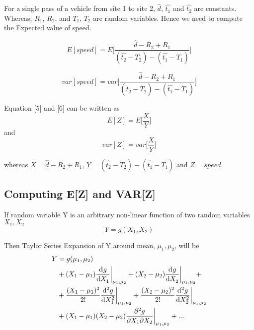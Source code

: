 \documentclass[10pt,twocolumn,letterpaper]{article}
\begin{document}
For a single pass of a vehicle from site 1 to site 2, $\hat{d}$, $\hat{t_1}$ and $\hat{t_2}$ are constants. Whereas, $R_1$, $R_2$, and $T_1$, $T_2$ are random variables. Hence we need to compute the Expected value of speed.

\begin{equation}
   E[speed] = E\bigg[ \frac{ \hat{d} - R_2 + R_1 }{ (\hat{t_2} - T_2 ) - (\hat{t_1} - T_1 ) } \bigg]
\end{equation}

\begin{equation}
   var[speed] = var\bigg[ \frac{ \hat{d} - R_2 + R_1 }{ (\hat{t_2} - T_2 ) - (\hat{t_1} - T_1 ) } \bigg] 
\end{equation}

Equation [5] and [6] can be written as 
\begin{equation}
   E[Z] = E\bigg[\frac{X}{Y}\bigg]
\end{equation}
and
\begin{equation} 
   var[Z] = var\bigg[\frac{X}{Y}\bigg]
\end{equation}

whereas \( X = \hat{d} - R_2 + R_1 \), \( Y = (\hat{t_2} - T_2 ) - (\hat{t_1} - T_1 ) \) and \( Z = speed\).

\subsection{Computing E[Z] and VAR[Z]}

If random variable Y is an arbitrary non-linear function of two random variables $X_1, X_2$ 
\begin{equation}
   Y = g(X_1, X_2)
\end{equation}

Then Taylor Series Expansion of Y around mean, $\mu_1, \mu_2$, will be
\begin{equation}
\label{Taylor_Expansion_of_G}
\begin{split}
   Y &= g(\mu_1, \mu_2) \\ &+ (X_1-\mu_1)\dv[]{g}{X_1}\bigg|_{\mu_1,\mu_2}+ (X_2-\mu_2)\dv[ ]{g}{X_2}\bigg|_{\mu_1,\mu_2}+ \\ &+ \frac{(X_1-\mu_1)^2}{2!}\dv[2]{g}{X_1}\bigg|_{\mu_1,\mu_2}+ \frac{(X_2-\mu_2)^2}{2!}\dv[2]{g}{X_2}\bigg|_{\mu_1,\mu_2} \\ &+ (X_1-\mu_1)(X_2-\mu_2)\pdv[]{g}{X_1}{X_2}\bigg|_{\mu_1,\mu_2} + ...
\end{split}
\end{equation}
\end{document}
